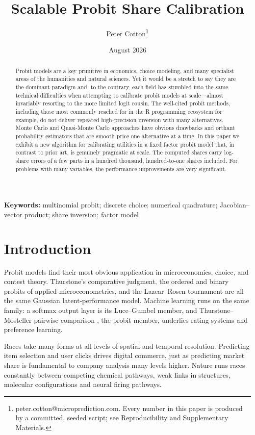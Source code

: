 \documentclass[12pt]{article}
\title{Scalable Probit Share Calibration}
\author{Peter Cotton\thanks{peter.cotton@microprediction.com. Every
number in this paper is produced by a committed, seeded script; see
Reproducibility and Supplementary Materials.}}
\date{August 2026}
\theoremstyle{remark}
\begin{document}
\maketitle

\begin{abstract}
Probit models are a key primitive in economics, choice modeling, and many specialist areas of the humanities and natural sciences. Yet it
would be a stretch to say they are the dominant paradigm and, to the contrary, each field
has stumbled into the same technical difficulties when attempting to calibrate probit models
at scale---almost invariably resorting to the more limited logit cousin. The well-cited probit methods, including those most commonly reached
for in the R programming ecosystem for example, do not deliver repeated
high-precision inversion with many alternatives. Monte 
Carlo and Quasi-Monte Carlo approaches have obvious drawbacks and orthant probability estimators that
are smooth price one alternative at a time. In this paper we exhibit a new algorithm for calibrating
utilities in a fixed factor probit model that, in contrast to prior art, is genuinely pragmatic at scale. The computed shares carry log-share errors of a few parts in
a hundred thousand, hundred-to-one shares included. For problems with many variables, the
performance improvements are very significant. 
\end{abstract}

\noindent\textbf{Keywords:} multinomial probit; discrete choice;
numerical quadrature; Jacobian--vector product; share inversion; factor
model

\section{Introduction}

Probit models find their most obvious application in microeconomics, choice, and contest theory. 
Thurstone's comparative judgment, the ordered and binary probits of applied
microeconometrics, and the Lazear--Rosen tournament
\citep{lazear1981} are all the same
Gaussian latent-performance model. Machine learning runs on the same
family: a softmax output layer is its Luce--Gumbel member, and
Thurstone--Mosteller pairwise comparison \citep{mosteller1951}, the
probit member, underlies
rating systems and preference learning. 

Races take many forms at all levels of spatial and temporal resolution. Predicting item selection and user clicks drives digital commerce, just as 
predicting market share is fundamental to company analysis many levels higher.  Nature runs races constantly between
competing chemical pathways,  weak links in structures,  molecular configurations and neural firing pathways. 
\end{document}
